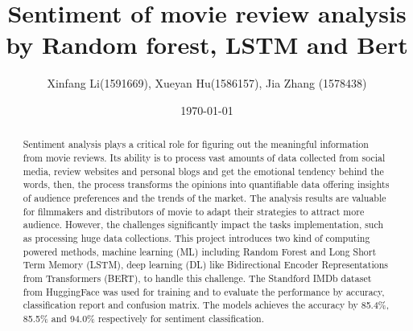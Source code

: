 \documentclass[11pt]{article}
\begin{document}
\title{
Sentiment of movie review analysis by Random forest, LSTM and Bert
}

\author{
  Xinfang Li(1591669), Xueyan Hu(1586157), Jia Zhang (1578438)
}
\date{\today}

\maketitle
\markboth{}{}

\begin{abstract}
Sentiment analysis plays a critical role for figuring out the meaningful information from movie reviews. Its ability is to process vast amounts of data collected from social media, review websites and personal blogs and get the emotional tendency behind the words, then, the process transforms the opinions into quantifiable data offering insights of audience preferences and the trends of the market. The analysis results are valuable for filmmakers and distributors of movie to adapt their strategies to attract more audience. However, the challenges significantly impact the tasks implementation, such as processing huge data collections. This project introduces two kind of computing powered methods, machine learning (ML) including Random Forest and Long Short Term Memory (LSTM), deep learning (DL) like Bidirectional Encoder Representations from Transformers (BERT), to handle this challenge. The Standford IMDb dataset from HuggingFace was used for training and to evaluate the performance by accuracy, classification report and confusion matrix. The models achieves the accuracy by 85.4\%, 85.5\% and 94.0\% respectively for sentiment classification.
\end{abstract}

\clearpage
\thispagestyle{empty}
\tableofcontents
\thispagestyle{empty}

\clearpage
\setcounter{page}{1}









\clearpage


\end{document}

